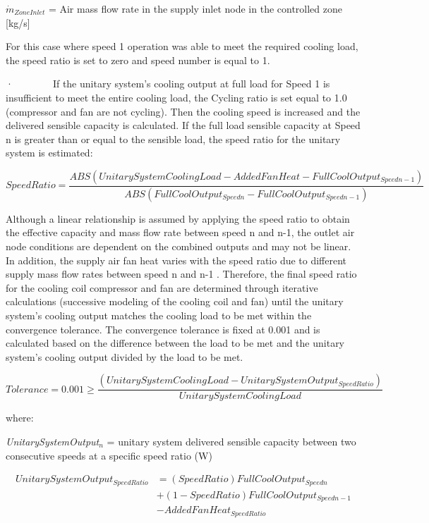 \({\dot m{_{ZoneInlet}}}\) = Air mass flow rate in the supply inlet node in the controlled zone {[}kg/s{]}

For this case where speed 1 operation was able to meet the required cooling load, the speed ratio is set to zero and speed number is equal to 1.

·~~~~~~~~If the unitary system's cooling output at full load for Speed 1 is insufficient to meet the entire cooling load, the Cycling ratio is set equal to 1.0 (compressor and fan are not cycling). Then the cooling speed is increased and the delivered sensible capacity is calculated. If the full load sensible capacity at Speed n is greater than or equal to the sensible load, the speed ratio for the unitary system is estimated:

\begin{equation}
SpeedRatio = \frac{{ABS\left( {UnitarySystemCoolingLoad - AddedFanHeat - FullCoolOutpu{t_{Speedn - 1}}} \right)}}{{ABS\left( {FullCoolOutpu{t_{Speedn}} - FullCoolOutpu{t_{Speedn - 1}}} \right)}}
\end{equation}

Although a linear relationship is assumed by applying the speed ratio to obtain the effective capacity and mass flow rate between speed n and n-1, the outlet air node conditions are dependent on the combined outputs and may not be linear. In addition, the supply air fan heat varies with the speed ratio due to different supply mass flow rates between speed n and n-1 . Therefore, the final speed ratio for the cooling coil compressor and fan are determined through iterative calculations (successive modeling of the cooling coil and fan) until the unitary system's cooling output matches the cooling load to be met within the convergence tolerance. The convergence tolerance is fixed at 0.001 and is calculated based on the difference between the load to be met and the unitary system's cooling output divided by the load to be met.

\begin{equation}
Tolerance = 0.001 \ge \frac{{\left( {UnitarySystemCoolingLoad - UnitarySystemOutpu{t_{SpeedRatio}}} \right)}}{{UnitarySystemCoolingLoad}}
\end{equation}

where:

\emph{UnitarySystemOutput\(_{n}\)} = unitary system delivered sensible capacity between two consecutive speeds at a specific speed ratio (W)

\begin{equation}
  \begin{array}{rl}
    UnitarySystemOutput_{SpeedRatio} &= (SpeedRatio)FullCoolOutput_{Speedn} \\
                                     &+ (1 - SpeedRatio)FullCoolOutput_{Speedn - 1} \\
                                     &- AddedFanHeat_{SpeedRatio}
  \end{array}
\end{equation}

